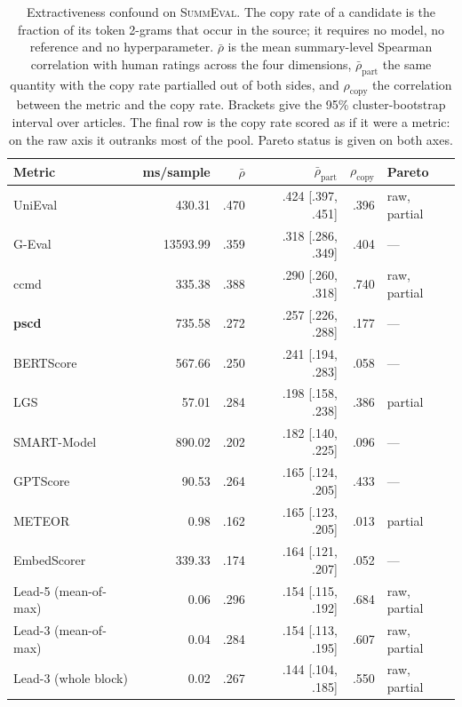 \begin{table}[t]
\centering
\caption{Extractiveness confound on \textsc{SummEval}. The copy rate of a candidate is the fraction of its token 2-grams that occur in the source; it requires no model, no reference and no hyperparameter. $\bar{\rho}$ is the mean summary-level Spearman correlation with human ratings across the four dimensions, $\bar{\rho}_{\mathrm{part}}$ the same quantity with the copy rate partialled out of both sides, and $\rho_{\mathrm{copy}}$ the correlation between the metric and the copy rate. Brackets give the 95\% cluster-bootstrap interval over articles. The final row is the copy rate scored as if it were a metric: on the raw axis it outranks most of the pool. Pareto status is given on both axes.}
\label{tab:confound}
\small
\linespread{1}\selectfont
\setlength{\tabcolsep}{4pt}
\begin{tabular}{@{}lrrrrl@{}}
\toprule
Metric & ms/sample & $\bar{\rho}$ & $\bar{\rho}_{\mathrm{part}}$ & $\rho_{\mathrm{copy}}$ & Pareto \\
\midrule
UniEval & 430.31 & .470 & .424 {\scriptsize [.397, .451]} & .396 & raw, partial \\
G-Eval & 13593.99 & .359 & .318 {\scriptsize [.286, .349]} & .404 & --- \\
ccmd & 335.38 & .388 & .290 {\scriptsize [.260, .318]} & .740 & raw, partial \\
\textbf{pscd} & 735.58 & .272 & .257 {\scriptsize [.226, .288]} & .177 & --- \\
BERTScore & 567.66 & .250 & .241 {\scriptsize [.194, .283]} & .058 & --- \\
LGS & 57.01 & .284 & .198 {\scriptsize [.158, .238]} & .386 & partial \\
SMART-Model & 890.02 & .202 & .182 {\scriptsize [.140, .225]} & .096 & --- \\
GPTScore & 90.53 & .264 & .165 {\scriptsize [.124, .205]} & .433 & --- \\
METEOR & 0.98 & .162 & .165 {\scriptsize [.123, .205]} & .013 & partial \\
EmbedScorer & 339.33 & .174 & .164 {\scriptsize [.121, .207]} & .052 & --- \\
Lead-5 (mean-of-max) & 0.06 & .296 & .154 {\scriptsize [.115, .192]} & .684 & raw, partial \\
Lead-3 (mean-of-max) & 0.04 & .284 & .154 {\scriptsize [.113, .195]} & .607 & raw, partial \\
Lead-3 (whole block) & 0.02 & .267 & .144 {\scriptsize [.104, .185]} & .550 & raw, partial \\

\end{tabular}
\end{table}
